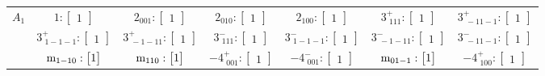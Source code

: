\documentclass[fleqn,8pt,landscape]{jsarticle}
\begin{document}
\begin{longtable}{ccccccc}
$ A_{1} $ & $ 1:\begin{bmatrix} 1 \end{bmatrix} $ & $ 2{}_{001}:\begin{bmatrix} 1 \end{bmatrix} $ & $ 2{}_{010}:\begin{bmatrix} 1 \end{bmatrix} $ & $ 2{}_{100}:\begin{bmatrix} 1 \end{bmatrix} $ & $ 3^{+}_{\,\,111}:\begin{bmatrix} 1 \end{bmatrix} $ & $ 3^{+}_{\,\,-11-1}:\begin{bmatrix} 1 \end{bmatrix} $ \\
& $ 3^{+}_{\,\,1-1-1}:\begin{bmatrix} 1 \end{bmatrix} $ & $ 3^{+}_{\,\,-1-11}:\begin{bmatrix} 1 \end{bmatrix} $ & $ 3^{-}_{\,\,111}:\begin{bmatrix} 1 \end{bmatrix} $ & $ 3^{-}_{\,\,1-1-1}:\begin{bmatrix} 1 \end{bmatrix} $ & $ 3^{-}_{\,\,-1-11}:\begin{bmatrix} 1 \end{bmatrix} $ & $ 3^{-}_{\,\,-11-1}:\begin{bmatrix} 1 \end{bmatrix} $ \\
& $ {\rm m}_{1-10}:\begin{bmatrix} 1 \end{bmatrix} $ & $ {\rm m}_{110}:\begin{bmatrix} 1 \end{bmatrix} $ & $ -4^{+}_{\,\,001}:\begin{bmatrix} 1 \end{bmatrix} $ & $ -4^{-}_{\,\,001}:\begin{bmatrix} 1 \end{bmatrix} $ & $ {\rm m}_{01-1}:\begin{bmatrix} 1 \end{bmatrix} $ & $ -4^{+}_{\,\,100}:\begin{bmatrix} 1 \end{bmatrix} $ \\

\end{longtable}
\end{document}

